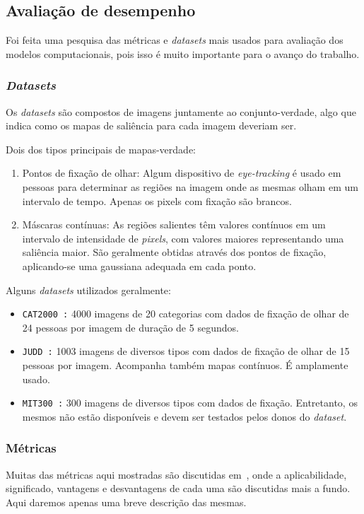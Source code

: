 \documentclass[article]{IEEEtran}
\newcommand{\tit}[1]{\textit{#1}}
\newcommand{\ttt}[1]{\texttt{#1}}
\begin{document}
\subsection{Avaliação de desempenho}
Foi feita uma pesquisa das métricas e \tit{datasets} mais usados para
avaliação dos modelos computacionais, pois isso
é muito importante para o avanço do trabalho.

\subsubsection{\tit{Datasets}}
Os \tit{datasets} são compostos de imagens juntamente ao conjunto-verdade,
algo que indica como os mapas de saliência para cada imagem deveriam ser.

Dois dos tipos principais de mapas-verdade:
\begin{enumerate}
	\item Pontos de fixação de olhar: Algum dispositivo de
	\tit{eye-tracking} é usado em pessoas para determinar as regiões na imagem
	onde as mesmas olham em um intervalo de tempo. Apenas os pixels com
	fixação são brancos.

	\item Máscaras contínuas: As regiões salientes têm valores
	contínuos em um intervalo de intensidade de \tit{pixels}, com valores
	maiores representando uma saliência maior.
	São geralmente obtidas através dos pontos de fixação, aplicando-se
	uma gaussiana adequada em cada ponto.
\end{enumerate}

Alguns \tit{datasets} utilizados geralmente:
\begin{itemize}
	\item \ttt{CAT2000~\cite{cat2000}:} 4000 imagens de 20 categorias com
		dados de fixação de olhar de 24 pessoas por imagem de duração de
		5 segundos.

	\item \ttt{JUDD~\cite{juddBM}:} 1003 imagens de diversos tipos com
		dados de fixação de olhar de 15 pessoas por imagem. Acompanha também
		mapas contínuos. É amplamente usado.

	\item \ttt{MIT300~\cite{mit-300}:} 300 imagens de diversos tipos
		com dados de fixação. Entretanto, os mesmos não estão disponíveis
		e devem ser testados pelos donos do \tit{dataset}.
\end{itemize}

\subsubsection{Métricas}
Muitas das métricas aqui mostradas são discutidas em~\cite{judd2},
onde a aplicabilidade, significado, vantagens e desvantagens
de cada uma são discutidas mais a fundo. Aqui daremos apenas uma breve
descrição das mesmas.
\end{document}

